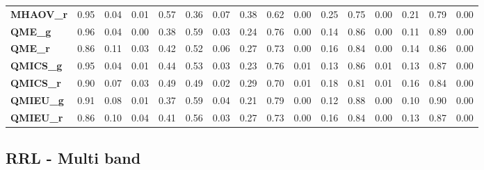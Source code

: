 \begin{anexo}
\begin{table}
{\begin{tabular}{lrrrrrrrrrrrrrrr}
\textbf{MHAOV\_r} &        0.95 &  0.04 &     0.01 &        0.57 &  0.36 &     0.07 &        0.38 &  0.62 &     0.00 &        0.25 &  0.75 &     0.00 &        0.21 &  0.79 &     0.00 \\
\textbf{QME\_g  } &        0.96 &  0.04 &     0.00 &        0.38 &  0.59 &     0.03 &        0.24 &  0.76 &     0.00 &        0.14 &  0.86 &     0.00 &        0.11 &  0.89 &     0.00 \\
\textbf{QME\_r  } &        0.86 &  0.11 &     0.03 &        0.42 &  0.52 &     0.06 &        0.27 &  0.73 &     0.00 &        0.16 &  0.84 &     0.00 &        0.14 &  0.86 &     0.00 \\
\textbf{QMICS\_g} &        0.95 &  0.04 &     0.01 &        0.44 &  0.53 &     0.03 &        0.23 &  0.76 &     0.01 &        0.13 &  0.86 &     0.01 &        0.13 &  0.87 &     0.00 \\
\textbf{QMICS\_r} &        0.90 &  0.07 &     0.03 &        0.49 &  0.49 &     0.02 &        0.29 &  0.70 &     0.01 &        0.18 &  0.81 &     0.01 &        0.16 &  0.84 &     0.00 \\
\textbf{QMIEU\_g} &        0.91 &  0.08 &     0.01 &        0.37 &  0.59 &     0.04 &        0.21 &  0.79 &     0.00 &        0.12 &  0.88 &     0.00 &        0.10 &  0.90 &     0.00 \\
\textbf{QMIEU\_r} &        0.86 &  0.10 &     0.04 &        0.41 &  0.56 &     0.03 &        0.27 &  0.73 &     0.00 &        0.16 &  0.84 &     0.00 &        0.13 &  0.87 &     0.00 \\
\bottomrule
\end{tabular}}
\end{table}


    \subsection{RRL - Multi band}
    

\end{anexo}
